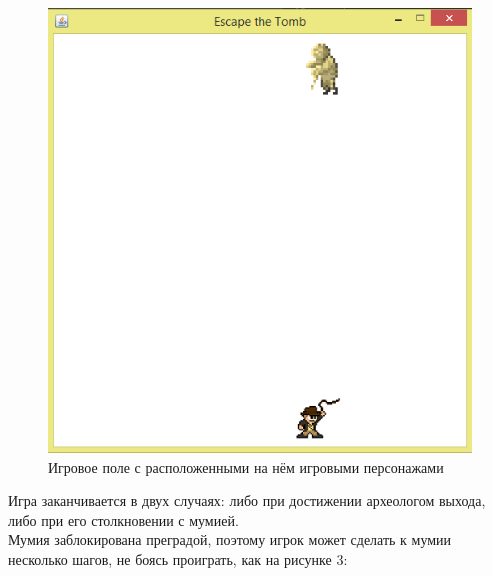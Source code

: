 \begin{figure}[H]
	\begin{center}
		\includegraphics[scale=0.7]{image/field1.png}
		\caption{Игровое поле с расположенными на нём игровыми персонажами} 
		\label{pic:pic_name} %
	\end{center}
\end{figure}

Игра заканчивается в двух случаях: либо при достижении археологом выхода, либо при его столкновении с мумией.\\

Мумия заблокирована преградой, поэтому игрок может сделать к мумии несколько шагов, не боясь проиграть, как на рисунке 3:

